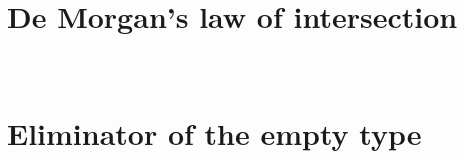 \begin{appendices}
\section{De Morgan's law of intersection}
\begin{code}
    \>[2]\AgdaSpace{}%
    \AgdaSymbol{:}\AgdaSpace{}%
    \AgdaSpace{}%
    \AgdaSymbol{(}\AgdaSpace{}%
    \AgdaSpace{}%
    \AgdaSymbol{)}\AgdaSpace{}%
    \AgdaSpace{}%
    \AgdaSymbol{(}\AgdaSpace{}%
    \AgdaSymbol{)}\AgdaSpace{}%
    \AgdaSpace{}%
    \AgdaSymbol{(}\AgdaSpace{}%
    \AgdaSymbol{)}\<%
    \\
    \>[2]\AgdaSpace{}%
    \AgdaSpace{}%
    \AgdaSymbol{=}\AgdaSpace{}%
    \AgdaSymbol{((}\AgdaSpace{}%
    \AgdaSpace{}%
    \AgdaSymbol{)}\AgdaSpace{}%
    \AgdaOperator{\AgdaInductiveConstructor{,}}\AgdaSpace{}%
    \AgdaSymbol{(}\AgdaSpace{}%
    \AgdaSpace{}%
    \AgdaSymbol{))}\<%
\end{code}

\section{Eliminator of the empty type}
\label{code:bottom-eliminator}
\begin{code}
    \>[0]\AgdaSpace{}%
    \AgdaSymbol{:}\AgdaSpace{}%
    \AgdaSymbol{\{}\AgdaSpace{}%
    \AgdaSymbol{:}\AgdaSpace{}%
    \AgdaSymbol{\}}\AgdaSpace{}%
    \AgdaSpace{}%
    \AgdaSpace{}%
    \AgdaSpace{}%
    \<%
    \\
    \>[0]\AgdaSpace{}%
    \AgdaSymbol{()}\<%
\end{code}


\end{appendices}
